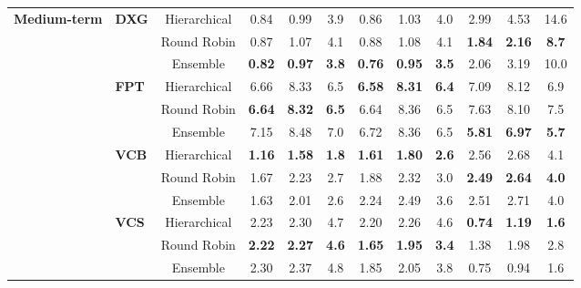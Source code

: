 \documentclass{ieeeaccess}
\begin{document}
\begin{table}[!h]
\begin{tabular}{llcccc|ccc|ccc}
\multirow{12}{*}{\textbf{Medium-term}}
& \multirow{3}{*}{\textbf{DXG}} & Hierarchical & 0.84 & 0.99 & 3.9 & 0.86 & 1.03 & 4.0 & 2.99 & 4.53 & 14.6 \\
& & Round Robin & 0.87 & 1.07 & 4.1 & 0.88 & 1.08 & 4.1 & \textbf{1.84} & \textbf{2.16} & \textbf{8.7} \\
& & Ensemble & \textbf{0.82} & \textbf{0.97} & \textbf{3.8} & \textbf{0.76} & \textbf{0.95} & \textbf{3.5} & 2.06 & 3.19 & 10.0 \\
& \multirow{3}{*}{\textbf{FPT}} & Hierarchical & 6.66 & 8.33 & 6.5 & \textbf{6.58} & \textbf{8.31} & \textbf{6.4} & 7.09 & 8.12 & 6.9 \\
& & Round Robin & \textbf{6.64} & \textbf{8.32} & \textbf{6.5} & 6.64 & 8.36 & 6.5 & 7.63 & 8.10 & 7.5 \\
& & Ensemble & 7.15 & 8.48 & 7.0 & 6.72 & 8.36 & 6.5 & \textbf{5.81} & \textbf{6.97} & \textbf{5.7} \\
& \multirow{3}{*}{\textbf{VCB}} & Hierarchical & \textbf{1.16} & \textbf{1.58} & \textbf{1.8} & \textbf{1.61} & \textbf{1.80} & \textbf{2.6} & 2.56 & 2.68 & 4.1 \\
& & Round Robin & 1.67 & 2.23 & 2.7 & 1.88 & 2.32 & 3.0 & \textbf{2.49} & \textbf{2.64} & \textbf{4.0} \\
& & Ensemble & 1.63 & 2.01 & 2.6 & 2.24 & 2.49 & 3.6 & 2.51 & 2.71 & 4.0 \\
& \multirow{3}{*}{\textbf{VCS}} & Hierarchical & 2.23 & 2.30 & 4.7 & 2.20 & 2.26 & 4.6 & \textbf{0.74} & \textbf{1.19} & \textbf{1.6} \\
& & Round Robin & \textbf{2.22} & \textbf{2.27} & \textbf{4.6} & \textbf{1.65} & \textbf{1.95} & \textbf{3.4} & 1.38 & 1.98 & 2.8 \\
& & Ensemble & 2.30 & 2.37 & 4.8 & 1.85 & 2.05 & 3.8 & 0.75 & 0.94 & 1.6 \\
\midrule


\end{tabular}
\end{table}
\end{document}
